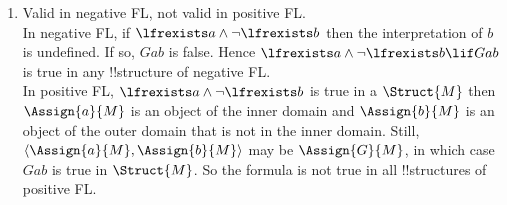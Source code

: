 \documentclass[../../../../include/open-logic-section]{subfiles}
\begin{document}
\begin{prob}
\begin{ans}
\begin{enumerate}
	is no !!{structure} in which $\eq[a][b]$ is true and $Fa \lif Fb$ 
	not true.
\item Valid in negative FL, not valid in positive FL.\\
	In negative FL, if $\lfrexists a \land \lnot \lfrexists b$ then
	the interpretation of $b$ is undefined. If so, $Gab$ is false. Hence
	$\lfrexists a \land \lnot \lfrexists b \lif Gab$ is true in any 
	!!{structure} of negative FL.\\
	In positive FL, $\lfrexists a \land \lnot \lfrexists b$ is true in a
	$\Struct{M}$ then $\Assign{a}{M}$ is an object of the inner domain 
	and $\Assign{b}{M}$ is an object of the outer domain that is not 
	in the inner domain. Still, $\langle \Assign{a}{M},\Assign{b}{M}
	\rangle$ may be $\Assign{G}{M}$, in which case $Gab$ is true in 
	$\Struct{M}$. So the formula is not true in all !!{structure}s of positive FL.
\end{enumerate}
\end{ans}
\end{prob}
\end{document}

